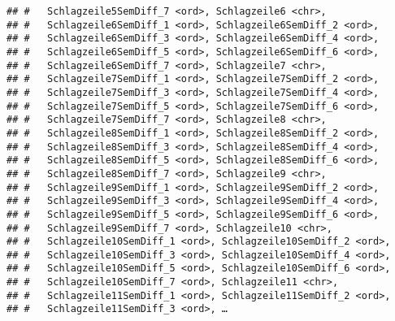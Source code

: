 \documentclass[]{article}
\begin{document}
\begin{verbatim}
## #   Schlagzeile5SemDiff_7 <ord>, Schlagzeile6 <chr>,
## #   Schlagzeile6SemDiff_1 <ord>, Schlagzeile6SemDiff_2 <ord>,
## #   Schlagzeile6SemDiff_3 <ord>, Schlagzeile6SemDiff_4 <ord>,
## #   Schlagzeile6SemDiff_5 <ord>, Schlagzeile6SemDiff_6 <ord>,
## #   Schlagzeile6SemDiff_7 <ord>, Schlagzeile7 <chr>,
## #   Schlagzeile7SemDiff_1 <ord>, Schlagzeile7SemDiff_2 <ord>,
## #   Schlagzeile7SemDiff_3 <ord>, Schlagzeile7SemDiff_4 <ord>,
## #   Schlagzeile7SemDiff_5 <ord>, Schlagzeile7SemDiff_6 <ord>,
## #   Schlagzeile7SemDiff_7 <ord>, Schlagzeile8 <chr>,
## #   Schlagzeile8SemDiff_1 <ord>, Schlagzeile8SemDiff_2 <ord>,
## #   Schlagzeile8SemDiff_3 <ord>, Schlagzeile8SemDiff_4 <ord>,
## #   Schlagzeile8SemDiff_5 <ord>, Schlagzeile8SemDiff_6 <ord>,
## #   Schlagzeile8SemDiff_7 <ord>, Schlagzeile9 <chr>,
## #   Schlagzeile9SemDiff_1 <ord>, Schlagzeile9SemDiff_2 <ord>,
## #   Schlagzeile9SemDiff_3 <ord>, Schlagzeile9SemDiff_4 <ord>,
## #   Schlagzeile9SemDiff_5 <ord>, Schlagzeile9SemDiff_6 <ord>,
## #   Schlagzeile9SemDiff_7 <ord>, Schlagzeile10 <chr>,
## #   Schlagzeile10SemDiff_1 <ord>, Schlagzeile10SemDiff_2 <ord>,
## #   Schlagzeile10SemDiff_3 <ord>, Schlagzeile10SemDiff_4 <ord>,
## #   Schlagzeile10SemDiff_5 <ord>, Schlagzeile10SemDiff_6 <ord>,
## #   Schlagzeile10SemDiff_7 <ord>, Schlagzeile11 <chr>,
## #   Schlagzeile11SemDiff_1 <ord>, Schlagzeile11SemDiff_2 <ord>,
## #   Schlagzeile11SemDiff_3 <ord>, …
\end{verbatim}
\end{document}
